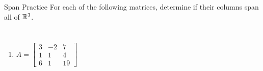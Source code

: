 \documentclass[xcoler=dvipsnames, aspectratio=169]{beamer}
\begin{document}
    \begin{frame}{Span Practice}
        For each of the following matrices, determine if their columns span all of $\mathbb{R}^3$.
        \begin{columns}
            \begin{enumerate}
                \item \[
                        A = \begin{bmatrix}
                            3 & -2 & 7\\
                            1 & 1 & 4\\
                            6 & 1 & 19
                        \end{bmatrix}
                    \]
                    \iftoggle{showSolutions}{
                        \pause
                        \[
                            \begin{bmatrix}
                            3 & -2 & 7\\
                            1 & 1 & 4\\
                            6 & 1 & 19
                            \end{bmatrix}\pause\rightarrow\begin{bmatrix}
                            1 & 1 & 4\\
                            3 & -2 & 7\\
                            6 & 1 & 19
                            \end{bmatrix}
                        \]
                        \[
                            \pause\rightarrow\begin{bmatrix}
                            1 & 1 & 4\\
                            0 & -5 & -5\\
                            0 & -5 & -5
                            \end{bmatrix}\pause\rightarrow\begin{bmatrix}
                            1 & 1 & 4\\
                            0 & -5 & -5\\
                            0 & 0 & 0
                            \end{bmatrix}
                        \]
                        \pause\rText{NO!}
                    }{}
            \end{enumerate}
            \begin{enumerate}

\end{enumerate}
\end{columns}
\end{frame}
\end{document}
